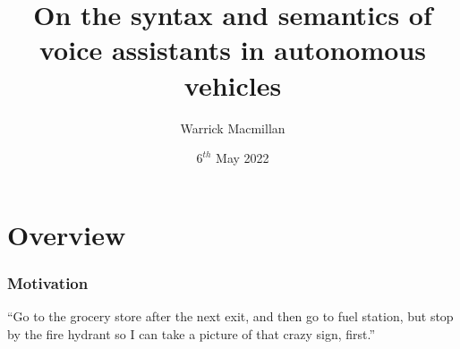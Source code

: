\documentclass{beamer}
\title{On the syntax and semantics of voice assistants in autonomous vehicles}
\author{Warrick Macmillan}
\date{$6^{th}$ May 2022}
\begin{document}
\begin{frame}
  \titlepage
\end{frame}

\section{Overview}



\begin{frame}
\frametitle{Motivation}

\begin{exampleblock}{}

  ``Go to the grocery store after the next exit, and then go to fuel station,
but stop by the fire hydrant so I can take a picture of that crazy sign,
first.''


\end{exampleblock}
\end{frame}
\end{document}
